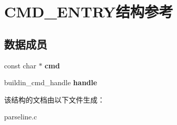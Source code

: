 \hypertarget{structCMD__ENTRY}{
\section{CMD\_\-ENTRY结构参考}
\label{structCMD__ENTRY}
}
\subsection*{数据成员}
\begin{DoxyCompactItemize}
\item 
\hypertarget{structCMD__ENTRY_a504a7f40c3261db3e10e1d2776642dd6}{
const char $\ast$ {\bfseries cmd}}
\label{structCMD__ENTRY_a504a7f40c3261db3e10e1d2776642dd6}

\item 
\hypertarget{structCMD__ENTRY_aa0b6f87402a8e4bdca0f3c2a678874e6}{
buildin\_\-cmd\_\-handle {\bfseries handle}}
\label{structCMD__ENTRY_aa0b6f87402a8e4bdca0f3c2a678874e6}

\end{DoxyCompactItemize}


该结构的文档由以下文件生成：\begin{DoxyCompactItemize}
\item 
parseline.c\end{DoxyCompactItemize}
